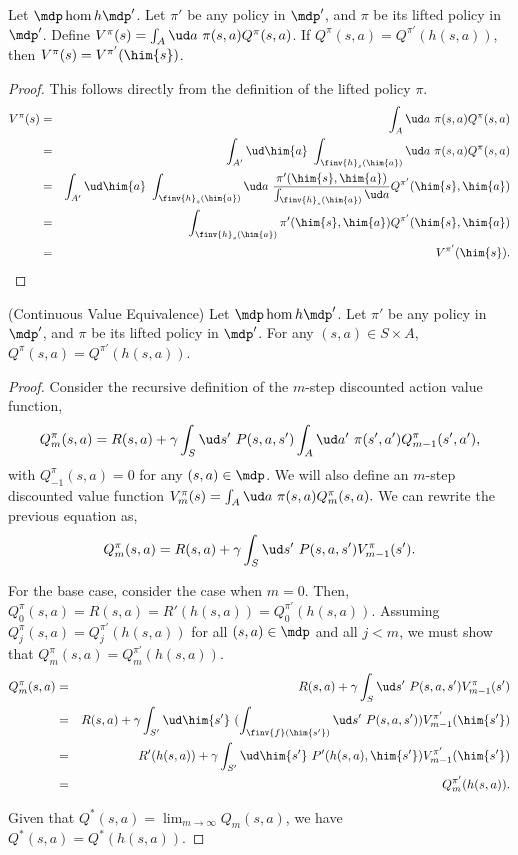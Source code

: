 \begin{lemma}
  \label{lm:cont-value-eq}
  Let $\mdp \hom{h} \mdp'$. Let $\pi'$ be any policy in $\mdp'$, and
  $\pi$ be its lifted policy in $\mdp'$. Define $V^{\pi}(s) = \int_{A}
  \ud a ~ \pi(s,a) Q^{\pi}(s,a)$. If $Q^{\pi}(s,a) = Q^{\pi'}(h(s,a))$,
  then $V^{\pi}(s) = V^{\pi'}(\him{s})$.
\end{lemma}
\begin{proof}
  This follows directly from the definition of the lifted policy $\pi$. 
  \begin{eqnarray*}
    V^{\pi}(s) &=& \int_{A}\ud a ~ \pi(s,a) Q^{\pi}(s,a) \\
    &=& \int_{A'} \ud \him{a} ~ \int_{\finv{h}_s(\him{a})} \ud a ~ \pi(s,a) Q^{\pi}(s,a) \\
    &=& \int_{A'} \ud \him{a} ~ \int_{\finv{h}_s(\him{a})} \ud a ~ \frac{\pi'(\him{s},\him{a})}{ \int_{\finv{h}_s(\him{a})} \ud a } Q^{\pi'}(\him{s},\him{a}) \\
    &=& \int_{\finv{h}_s (\him{a})} \pi'(\him{s},\him{a}) Q^{\pi'}(\him{s},\him{a}) \\
    &=& V^{\pi'}(\him{s}).
  \end{eqnarray*}
\end{proof}


\begin{theorem}(Continuous Value Equivalence)
  \label{thm:cont-value-eq}
  Let $\mdp \hom{h} \mdp'$. Let $\pi'$ be any policy in $\mdp'$, and
  $\pi$ be its lifted policy in $\mdp'$. For any $(s,a) \in S \times A$,
  $Q^{\pi}(s,a) = Q^{\pi'}(h(s,a))$.
\end{theorem}
\begin{proof}
  Consider the recursive definition of the $m$-step discounted action
  value function, $$Q^{\pi}_m(s,a) = R(s,a) + \gamma \int_{S} \ud s'
  ~ P(s,a,s') \int_{A} \ud a' ~ \pi(s',a') Q^{\pi}_{m-1}(s',a'),$$ with
  $Q^{\pi}_{-1}(s,a) = 0$ for any $(s,a) \in \mdp$. We will also define
  an $m$-step discounted value function $V^{\pi}_m(s) = \int_{A} \ud
  a ~ \pi(s,a) Q^{\pi}_m(s,a).$ We can rewrite the previous equation
  as,$$Q^{\pi}_m(s,a) = R(s,a) + \gamma \int_{S} \ud s' ~ P(s,a,s')
  V^{\pi}_{m-1}(s').$$ 

  For the base case, consider the case when $m = 0$. Then,
  $Q^{\pi}_0(s,a) = R(s,a) = R'(h(s,a)) = Q^{\pi'}_0(h(s,a))$.  Assuming
  $Q^{\pi}_j(s,a) = Q^{\pi'}_j(h(s,a))$ for all $(s,a) \in \mdp$ and all
  $j < m$, we must show that $Q^{\pi}_m(s,a) = Q^{\pi'}_m(h(s,a))$. 
  \begin{eqnarray*}
    Q^{\pi}_m(s,a) &=& R(s,a) + \gamma \int_{S} \ud s' ~ P(s,a,s') V^{\pi}_{m-1}(s') \\
    &=& R(s,a) + \gamma \int_{S'} \ud \him{s'} ~ ( \int_{\finv{f}(\him{s'})} \ud s' ~ P(s,a,s') ) V^{\pi'}_{m-1}(\him{s'}) \\
    &=& R'(h(s,a)) + \gamma \int_{S'} \ud \him{s'} ~ P'(h(s,a),\him{s'}) V^{\pi'}_{m-1}(\him{s'}) \\
    &=& Q^{\pi'}_m(h(s,a)).
  \end{eqnarray*}

  Given that $Q^*(s,a) = \lim_{m \to \infty} Q_m(s,a)$, we have
  $Q^*(s,a) = Q^*(h(s,a))$.
\end{proof}

